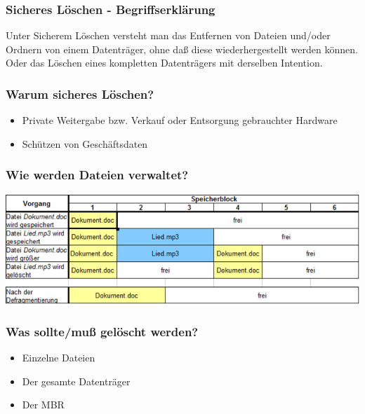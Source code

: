
\begin{frame}
\frametitle{Sicheres Löschen - Begriffserklärung}

Unter Sicherem Löschen versteht man das Entfernen von Dateien und/oder Ordnern von einem Datenträger, ohne daß diese wiederhergestellt werden können.\\ \pause
Oder das Löschen eines kompletten Datenträgers mit derselben Intention.
\end{frame}

\begin{frame}
  \frametitle{Warum sicheres Löschen?}
  \begin{itemize}
    \item Private Weitergabe bzw. Verkauf oder Entsorgung gebrauchter Hardware
    \item Schützen von Geschäftsdaten
  \end{itemize}
\end{frame}

\begin{frame}
  \frametitle{Wie werden Dateien verwaltet?}
  \includegraphics[width=0.9\linewidth]{Bilder/defragmentierung}
\end{frame}

\begin{frame}
  \frametitle{Was sollte/muß gelöscht werden?}
  \begin{itemize}
    \item Einzelne Dateien
    \item Der gesamte Datenträger
    \item Der MBR
  \end{itemize}
\end{frame}

